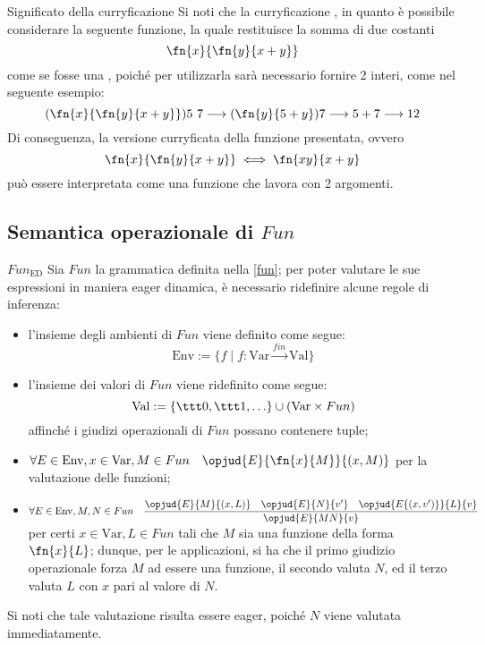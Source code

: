 \documentclass[a4paper, 12pt]{report}
\begin{document}
    \begin{framedobs}{Significato della curryficazione}
        Si noti che la curryficazione , in quanto è possibile considerare la seguente funzione, la quale restituisce la somma di due costanti $$\fn{x}{\fn{y}{x + y}}$$ come se fosse una , poiché per utilizzarla sarà necessario fornire 2 interi, come nel seguente esempio: $$(\fn{x}{\fn{y}{x + y}})5 \ 7 \longrightarrow (\fn{y}{5 + y})7 \longrightarrow 5 + 7 \longrightarrow 12$$ Di conseguenza, la versione curryficata della funzione presentata, ovvero $$\fn{x}{\fn{y}{x + y}} \iff \fn{xy}{x + y}$$ può essere interpretata come una funzione che lavora con 2 argomenti.
    \end{framedobs}

    \subsection{Semantica operazionale di $Fun$}

    \begin{framedprop}{$Fun_\mathrm{ED}$}
        Sia $Fun$ la grammatica definita nella \cref{fun}; per poter valutare le sue espressioni in maniera eager dinamica, è necessario ridefinire alcune regole di inferenza:

        \begin{itemize}
            \item l'insieme degli ambienti di $Fun$ viene definito come segue: $$\mathrm{Env} := \{f \mid f : \mathrm{Var} \xrightarrow{fin} \mathrm{Val}\}$$
            \item l'insieme dei valori di $Fun$ viene ridefinito come segue: $$\mathrm{Val} := \{ \ttt 0, \ttt 1 , \ldots \} \cup (\mathrm{Var} \times Fun)$$ affinché i giudizi operazionali di $Fun$ possano contenere tuple;
            \item $\forall E \in \mathrm{Env}, x \in \mathrm{Var}, M \in Fun \quad \opjud{E}{\fn{x}{M}}{(x,M)}$ per la valutazione delle funzioni;
            \item $\forall E \in \mathrm{Env}, M,N \in Fun \quad \dfrac{\opjud{E}{M}{(x,L)} \quad \opjud{E}{N}{v'} \quad \opjud{E\{(x,v')\}}{L}{v}}{\opjud{E}{MN}{v}}$ per certi $x \in \mathrm{Var}, L \in Fun$ tali che $M$ sia una funzione della forma $\fn{x}{L}$; dunque, per le applicazioni, si ha che il primo giudizio operazionale forza $M$ ad essere una funzione, il secondo valuta $N$, ed il terzo valuta $L$ con $x$ pari al valore di $N$.
        \end{itemize}

        Si noti che tale valutazione risulta essere eager, poiché $N$ viene valutata immediatamente.
    \end{framedprop}
\end{document}
